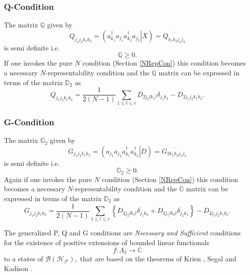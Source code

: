 \documentclass[aps,preprint]{revtex4}%
\begin{document}
\subsubsection{Q-Condition}

The matrix $\mathbb{Q}$ given by
\begin{equation}
Q_{j_{1}j_{2}k_{1}k_{2}}=\left(  \left.  a_{k_{1}}^{\dagger}a_{j_{1}}a_{k_{2}%
}^{\dagger}a_{j_{2}}\right\vert X\right)  =\overline{Q_{k_{1}k_{2}j_{1}j_{2}}}%
\end{equation}
is semi definite i.e.
\begin{equation}
\mathbb{Q}\geq0.
\end{equation}
If one invokes the pure $N$ condition (Section \ref{NRepCon}) this condition
becomes a necessary $N$-representability condition and the $\mathbb{Q}$ matrix
can be expressed in terms of the matrix $\mathbb{D}_{2}$ as
\begin{equation}
Q_{j_{1}j_{2}k_{1}k_{2}}=\frac{1}{2\left(  N-1\right)  }\sum_{1\leq l\leq
r}D_{2j_{2}lk_{1}l}\delta_{j_{1}k_{2}}-D_{2j_{1}j_{2}k_{1}k_{2}}.
\end{equation}


\subsubsection{G-Condition}

The matrix $\mathbb{G}_{2}$ given by
\begin{equation}
G_{j_{1}j_{2}k_{1}k_{2}}=\left(  \left.  a_{j_{1}}a_{j_{2}}a_{k_{1}}^{\dagger
}a_{k_{2}}^{\dagger}\right\vert D\right)  =\overline{G_{2k_{1}k_{2}j_{1}j_{2}%
}}%
\end{equation}
is semi definite i.e.
\begin{equation}
\mathbb{G}_{2}\geq0.
\end{equation}
Again if one invokes the pure $N$ condition (Section \ref{NRepCon}) this
condition becomes a necessary $N$-representability condition and the
$\mathbb{G}$ matrix can be expressed in terms of the matrix $\mathbb{D}_{2}$
as
\begin{equation}
G_{j_{1}j_{2}k_{1}k_{2}}=\frac{1}{2\left(  N-1\right)  }\sum_{1\leq l\leq
r}\left\{  D_{2j_{2}lk_{1}l}\delta_{j_{1}k_{2}}+D_{2j_{1}lk_{2}l}\delta
_{j_{2}k_{1}}\right\}  -D_{2j_{1}j_{2}k_{1}k_{2}}.
\end{equation}


The generalized P, Q and G conditions are \emph{Necessary and Sufficient
}conditions for the existence of positive extensions of bounded linear
functionals
\begin{equation}
f:\Lambda_{2}\rightarrow\mathbb{C}%
\end{equation}
to a states of $\mathcal{B}\left(  \mathcal{H}_{\mathcal{F}}\right)  ,$ that
are based on the theorems of Krien \cite{Krein}, Segal \cite{Segal} and
Kadison \cite{Kadison}.
\end{document}
